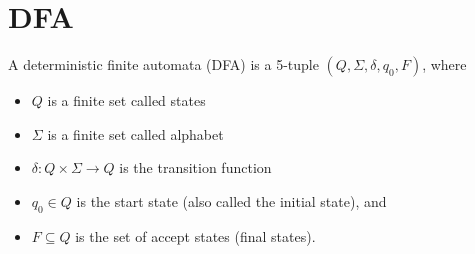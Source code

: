 \section{DFA}

A deterministic finite automata (DFA) is a 5-tuple $(Q, \Sigma, \delta, q_0, F)$, where

\begin{itemize}
    \item $Q$ is a finite set called states
    \item $\Sigma$ is a finite set called alphabet
    \item $\delta: Q \times \Sigma \rightarrow Q$ is the transition function
    \item $q_0 \in Q$ is the start state (also called the initial state), and 
    \item $F \subseteq Q$ is the set of accept states (final states).
\end{itemize}